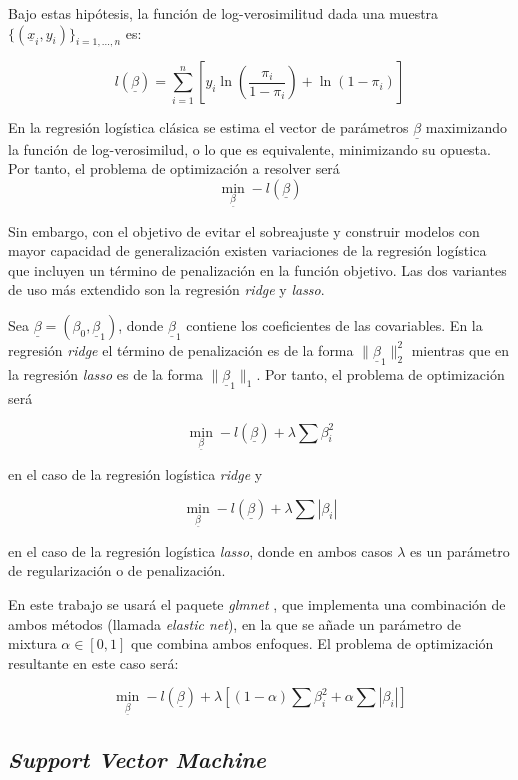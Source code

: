 \documentclass[12pt,a4paper,]{book}
\numberwithin{dummy}{section}
\theoremstyle{ocrenumbox}
\theoremstyle{blacknumex}
\theoremstyle{blacknumbox}
\theoremstyle{ocrenum}
\theoremstyle{ocrenum}
\begin{document}
Bajo estas hipótesis, la función de log-verosimilitud dada una muestra
\(\{ (\underline x_i,y_i) \}_{i=1,...,n}\) es:

\[ l(\underline \beta) = 
\sum_{i=1}^n \left[ 
y_i\ln \left( \frac{\pi_i}{1-\pi_i} \right) + 
\ln \left( 1 - \pi_i\right) \right]\]

En la regresión logística clásica se estima el vector de parámetros
\(\underline \beta\) maximizando la función de log-verosimilud, o lo que
es equivalente, minimizando su opuesta. Por tanto, el problema de
optimización a resolver será
\[\min_{\underline \beta} -l(\underline \beta)\]

Sin embargo, con el objetivo de evitar el sobreajuste y construir
modelos con mayor capacidad de generalización existen variaciones de la
regresión logística que incluyen un término de penalización en la
función objetivo. Las dos variantes de uso más extendido son la
regresión \emph{ridge} y \emph{lasso}.

Sea \(\underline \beta = \left( \beta_0, \underline \beta_1 \right)\),
donde \(\underline \beta_1\) contiene los coeficientes de las
covariables. En la regresión \emph{ridge} el término de penalización es
de la forma \(\| \underline \beta_1 \|^2_2\) mientras que en la
regresión \emph{lasso} es de la forma \(\| \underline \beta_1 \|_1\).
Por tanto, el problema de optimización será

\[\min_{\underline \beta} -l(\underline \beta)  + \lambda \sum \beta_i^2 \]

en el caso de la regresión logística \emph{ridge} y

\[\min_{\underline \beta} -l(\underline \beta)  + \lambda \sum |\beta_i|\]

en el caso de la regresión logística \emph{lasso}, donde en ambos casos
\(\lambda\) es un parámetro de regularización o de penalización.

En este trabajo se usará el paquete \emph{glmnet} \citep{glmnetpackage},
que implementa una combinación de ambos métodos (llamada \emph{elastic
net}), en la que se añade un parámetro de mixtura
\(\alpha \in \left[0,1\right]\) que combina ambos enfoques. El problema
de optimización resultante en este caso será:

\[\min_{\underline \beta} -l(\underline \beta)  + \lambda \left[(1-\alpha)\sum \beta_i^2 + \alpha \sum |\beta_i| \right]\]

\hypertarget{support-vector-machine}{%
\subsection{\texorpdfstring{\emph{Support Vector
Machine}}{Support Vector Machine}}\label{support-vector-machine}}
\end{document}
